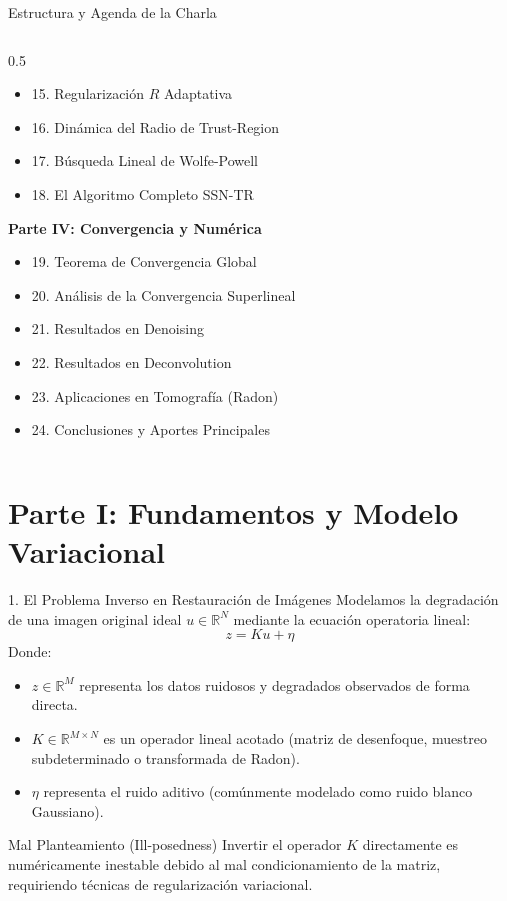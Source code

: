 \documentclass[aspectratio=169,11pt]{beamer}
\begin{document}
\begin{frame}{Estructura y Agenda de la Charla}
\begin{columns}[t]
\begin{column}{0.5\textwidth}
\begin{itemize}
                \item 15. Regularización $R$ Adaptativa
                \item 16. Dinámica del Radio de Trust-Region
                \item 17. Búsqueda Lineal de Wolfe-Powell
                \item 18. El Algoritmo Completo SSN-TR
            \end{itemize}
            \vspace{0.2cm}
            \textbf{Parte IV: Convergencia y Numérica}
            \begin{itemize}
                \item 19. Teorema de Convergencia Global
                \item 20. Análisis de la Convergencia Superlineal
                \item 21. Resultados en Denoising
                \item 22. Resultados en Deconvolution
                \item 23. Aplicaciones en Tomografía (Radon)
                \item 24. Conclusiones y Aportes Principales
            \end{itemize}
        \end{column}
    \end{columns}
\end{frame}

\section{Parte I: Fundamentos y Modelo Variacional}

\begin{frame}{1. El Problema Inverso en Restauración de Imágenes}
    Modelamos la degradación de una imagen original ideal $u \in \mathbb{R}^N$ mediante la ecuación operatoria lineal:
    \begin{equation}
        z = Ku + \eta
    \end{equation}
    Donde:
    \begin{itemize}
        \item $z \in \mathbb{R}^M$ representa los datos ruidosos y degradados observados de forma directa.
        \item $K \in \mathbb{R}^{M \times N}$ es un operador lineal acotado (matriz de desenfoque, muestreo subdeterminado o transformada de Radon).
        \item $\eta$ representa el ruido aditivo (comúnmente modelado como ruido blanco Gaussiano).
    \end{itemize}
    \begin{block}{Mal Planteamiento (Ill-posedness)}
        Invertir el operador $K$ directamente es numéricamente inestable debido al mal condicionamiento de la matriz, requiriendo técnicas de regularización variacional.
    \end{block}
\end{frame}
\end{document}
